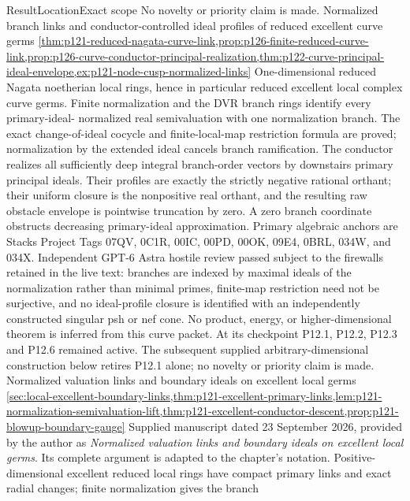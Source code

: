 \begin{AppLProvenanceLedger}{Result}{Location}{Exact scope}
{   No novelty or priority claim is made.}
\AppLProvenanceRecord
  {Normalized branch links and conductor-controlled ideal profiles of
   reduced excellent curve germs}
  {\cref{thm:p121-reduced-nagata-curve-link,prop:p126-finite-reduced-curve-link,prop:p126-curve-conductor-principal-realization,thm:p122-curve-principal-ideal-envelope,ex:p121-node-cusp-normalized-links}}
  {One-dimensional reduced Nagata noetherian local rings, hence in
   particular reduced excellent local complex curve germs.  Finite
   normalization and the DVR branch rings identify every primary-ideal-
   normalized real semivaluation with one normalization branch.  The exact
   change-of-ideal cocycle and finite-local-map restriction formula are
   proved; normalization by the extended ideal cancels branch ramification.
   The conductor realizes all sufficiently deep integral branch-order
   vectors by downstairs primary principal ideals.  Their profiles are
   exactly the strictly negative rational orthant; their uniform closure is
   the nonpositive real orthant, and the resulting raw obstacle envelope is
   pointwise truncation by zero.  A zero branch coordinate obstructs
   decreasing primary-ideal approximation.
   Primary algebraic anchors are Stacks Project Tags 07QV, 0C1R, 00IC,
   00PD, 00OK, 09E4, 0BRL, 034W, and 034X.  Independent GPT-6 Astra hostile review
   passed subject to the firewalls retained in the live text: branches are
   indexed by maximal ideals of the normalization rather than minimal
   primes, finite-map restriction need not be surjective, and no
   ideal-profile closure is identified with an independently constructed
   singular psh or nef cone.  No product, energy, or higher-dimensional
   theorem is inferred from this curve packet. At its checkpoint P12.1,
   P12.2, P12.3 and P12.6 remained active. The subsequent supplied
   arbitrary-dimensional construction below retires P12.1 alone;
   no novelty or priority claim is made.}
\AppLProvenanceRecord
  {Normalized valuation links and boundary ideals on excellent local germs}
  {\cref{sec:local-excellent-boundary-links,thm:p121-excellent-primary-links,lem:p121-normalization-semivaluation-lift,thm:p121-excellent-conductor-descent,prop:p121-blowup-boundary-gauge}}
  {Supplied manuscript dated 23 September 2026, provided by the author as
   \emph{Normalized valuation links and boundary ideals on excellent local
   germs}. Its complete argument is adapted to the chapter's notation.
   Positive-dimensional excellent reduced local rings have compact primary
   links and exact radial changes; finite normalization gives the branch
}
\end{AppLProvenanceLedger}

